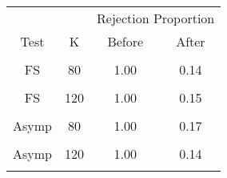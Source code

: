 \begin{table}[!h]
\centering
\begin{tabular}{cccc}
\toprule
\multicolumn{1}{c}{ } & \multicolumn{1}{c}{ } & \multicolumn{2}{c}{Rejection Proportion} \\
\cmidrule(l{3pt}r{3pt}){3-4}
Test & K & Before & After\\
\midrule
\cellcolor{gray!6}{FS} & \cellcolor{gray!6}{60} & \cellcolor{gray!6}{1.00} & \cellcolor{gray!6}{0.15}\\
FS & 80 & 1.00 & 0.14\\
\cellcolor{gray!6}{FS} & \cellcolor{gray!6}{100} & \cellcolor{gray!6}{1.00} & \cellcolor{gray!6}{0.13}\\
FS & 120 & 1.00 & 0.15\\
\cellcolor{gray!6}{Asymp} & \cellcolor{gray!6}{60} & \cellcolor{gray!6}{1.00} & \cellcolor{gray!6}{0.17}\\
\addlinespace
Asymp & 80 & 1.00 & 0.17\\
\cellcolor{gray!6}{Asymp} & \cellcolor{gray!6}{100} & \cellcolor{gray!6}{1.00} & \cellcolor{gray!6}{0.15}\\
Asymp & 120 & 1.00 & 0.14\\
\cellcolor{gray!6}{ECE} & \cellcolor{gray!6}{} & \cellcolor{gray!6}{0.26} & \cellcolor{gray!6}{0.15}\\
\bottomrule
\end{tabular}
\end{table}
